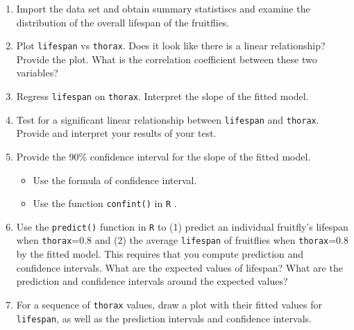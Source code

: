 \documentclass[12pt,letterpaper]{article}
\begin{document}
\begin{enumerate}
	
	\item
	Import the data set and obtain summary statistiscs and examine the distribution of the overall lifespan of the fruitflies.  

\newpage
	\item
	Plot \texttt{lifespan} vs \texttt{thorax}. Does it look like there is a linear relationship? Provide the plot. What is the correlation coefficient between these two variables?
		\vspace{6cm}
	\item
	Regress \texttt{lifespan} on \texttt{thorax}.  Interpret the slope of the fitted model.
			\vspace{6cm}
	\item
	Test for a significant linear relationship between  \texttt{lifespan} and \texttt{thorax}. Provide and interpret your results of your test.
	
\newpage
	\item
	
	Provide the 90\% confidence interval for the slope of the fitted model.
	
			\vspace{.5cm}
	\begin{itemize}
		\item
		Use the formula of confidence interval.		\vspace{.5cm}
		\item
		Use the function  \texttt{confint()}  in \texttt{R} .
	\end{itemize}
			\vspace{6cm}
	\item Use the \texttt{predict()} function in \texttt{R} to (1) predict an individual fruitfly's lifespan when \texttt{thorax}=0.8 and (2) the average \texttt{lifespan} of fruitflies when \texttt{thorax}=0.8 by the fitted model. This requires that you compute prediction and confidence intervals. What are the expected values of lifespan? What are the prediction and confidence intervals around the expected values? 
	
			\vspace{6cm}
	\item	For a sequence of \texttt{thorax} values, draw a plot with their fitted values for \texttt{lifespan}, as well as the prediction intervals and confidence intervals.



\end{enumerate}
\end{document}

